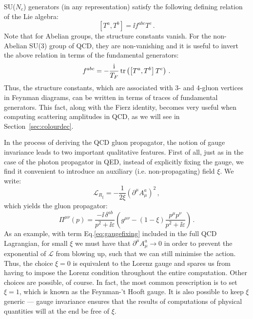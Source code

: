 \documentclass[main.tex]{subfiles}
\begin{document}
SU($N_c$) generators (in any representation) satisfy the following defining relation of the Lie algebra:
\begin{equation} \label{eq:liealgebra}
    \left[T^a, T^b\right] = \ii f^{abc} T^c\,.
\end{equation}
Note that for Abelian groups, the structure constants vanish. For the non-Abelian SU(3) group of QCD, they are non-vanishing and it is useful to invert the above relation in terms of the fundamental generators:
\begin{equation} \label{eq:fabc}
    f^{abc} = -\frac{\mathrm{i}}{T_F} \operatorname{\rm tr} \left(\left[T^a, T^b \right] T^c \right)\,.
\end{equation}
Thus, the structure constants, which are associated with 3- and 4-gluon vertices in Feynman diagrams, can be written in terms of traces of fundamental generators. This fact, along with the Fierz identity, becomes very useful when computing scattering amplitudes in QCD, as we will see in Section~\ref{sec:colourdec}.

In the process of deriving the QCD gluon propagator, the notion of gauge invariance leads to two important qualitative features. First of all, just as in the case of the photon propagator in QED, instead of explicitly fixing the gauge, we find it convenient to introduce an auxiliary (i.e. non-propagating) field $\xi$. We write:
\begin{equation} \label{eq:gaugefixing}
    \mathcal{L}_{R_\xi} = -\frac{1}{2 \xi} \left(\partial^\mu A^a_\mu \right)^2\,,
\end{equation}
which yields the gluon propagator:
\begin{equation}
    \Pi^{\mu\nu}(p) = \frac{-\ii \, \delta^{ab}}{p^2+ \ii \varepsilon} \left(g^{\mu\nu} - (1-\xi) \frac{p^\mu p^\nu}{p^2+\ii \varepsilon} \right)\,.
\end{equation}
As an example, with term Eq.\ref{eq:gaugefixing} included in the full QCD Lagrangian, for small $\xi$ we must have that $\partial^\mu A^a_\mu \rightarrow 0$ in order to prevent the exponential of $\mathcal{L}$ from blowing up, such that we can still minimise the action. Thus, the choice $\xi = 0$ is equivalent to the Lorenz gauge and spares us from having to impose the Lorenz condition throughout the entire computation. Other choices are possible, of course. In fact, the most common prescription is to set $\xi = 1$, which is known as the Feynman-'t Hooft gauge. It is also possible to keep $\xi$ generic --- gauge invariance ensures that the results of computations of physical quantities will at the end be free of $\xi$.
\end{document}
